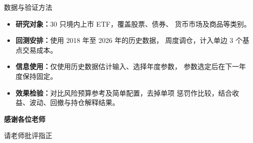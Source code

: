 \documentclass[aspectratio=169,12pt]{beamer}
\begin{document}
\begin{frame}{数据与验证方法}
  \begin{itemize}
    \setlength{\itemsep}{9pt}
    \item \textbf{研究对象：}30 只境内上市 ETF，覆盖股票、债券、\newline
      货币市场及商品等类别。
    \item \textbf{回测安排：}使用 2018 年至 2026 年的历史数据，\newline
      周度调仓，计入单边 3 个基点交易成本。
    \item \textbf{信息使用：}仅使用历史数据估计输入、选择年度参数，\newline
      参数选定后在下一年度保持固定。
    \item \textbf{效果检验：}对比风险预算参考及简单配置，去掉单项\newline
      惩罚作比较，结合收益、波动、回撤与持仓解释结果。
  \end{itemize}
\end{frame}

\begin{frame}
  \centering
  \vspace{10mm}
  {\color{Navy}\LARGE\bfseries 感谢各位老师\par}
  \vspace{6mm}
  {\large 请老师批评指正\par}
\end{frame}
\end{document}
